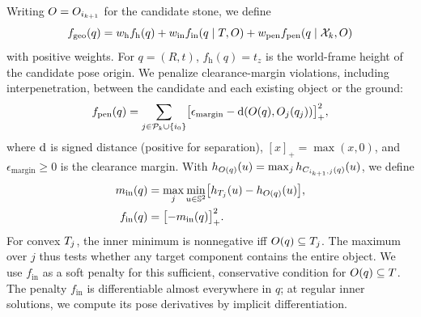 Writing $O=O_{i_{k+1}}$ for the candidate stone, we define
\begin{equation*}
  f_\mathrm{geo}(q) = w_\mathrm{h} f_\mathrm{h}(q) + w_\mathrm{in} f_\mathrm{in}(q \mid T, O) + w_\mathrm{pen} f_\mathrm{pen}(q \mid \mathcal{X}_k, O)
\end{equation*}
with positive weights. For $q=(R,t)$, $f_\mathrm{h}(q)=t_z$ is the world-frame height of the candidate pose origin.
We penalize clearance-margin violations, including interpenetration, between the candidate and each existing object or the ground:
\begin{equation*}
  f_\mathrm{pen}(q)=\sum_{j\in\mathcal{P}_k\cup\{i_0\}}
  \bigl[\epsilon_\mathrm{margin}-\operatorname{d}(O(q),O_j(q_j))\bigr]_+^2,
\end{equation*}
where $\operatorname{d}$ is signed distance (positive for separation), $[x]_+=\max(x,0)$, and $\epsilon_\mathrm{margin}\geq0$ is the clearance margin.
With $h_{O(q)}(u)=\max_jh_{C_{i_{k+1},j}(q)}(u)$, we define
\begin{equation*}
  \begin{aligned}
    m_\mathrm{in}(q) & =\max_j\min_{u\in\mathbb{S}^2}\bigl[h_{T_j}(u)-h_{O(q)}(u)\bigr], \\
    f_\mathrm{in}(q) & =\bigl[-m_\mathrm{in}(q)\bigr]_+^2.
  \end{aligned}
\end{equation*}
For convex $T_j$, the inner minimum is nonnegative iff $O(q)\subseteq T_j$.
The maximum over $j$ thus tests whether any target component contains the entire object.
We use $f_\mathrm{in}$ as a soft penalty for this sufficient, conservative condition for $O(q)\subseteq T$.
The penalty $f_\mathrm{in}$ is differentiable almost everywhere in $q$; at regular inner solutions, we compute its pose derivatives by implicit differentiation.



